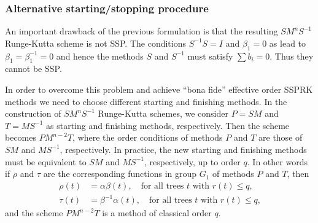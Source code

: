 \subsubsection{Alternative starting/stopping procedure}\label{subsection3.2.2}

An important drawback of the previous formulation is that the resulting \( SM^{n}S^{-1} \) Runge-Kutta scheme is not SSP. The conditions \( S^{-1}S = I \) and \( \beta_{1} = 0 \) as lead to \( \beta_{1} = \beta^{-1}_{1} = 0 \) and hence the methods \( S \) and \( S^{-1} \) must satisfy $\sum b_i = 0$.  Thus they cannot be SSP.  


In order to overcome this problem and achieve ``bona fide'' effective order SSPRK methods we need to choose different starting and finishing methods. In the construction of \( SM^{n}S^{-1} \) Runge-Kutta schemes, we consider \( P = SM \) and \( T = MS^{-1} \) as starting and finishing methods, respectively. Then the scheme becomes \( PM^{n-2}T \), where the order conditions of methods \( P \) and \( T \) are those of \( SM \) and \( MS^{-1} \), respectively.
In practice, the new starting and finishing methods must be equivalent to \( SM \) and \( MS^{-1} \), respectively, up to order $q$.
 In other words if \( \rho \) and \( \tau \) are the corresponding functions in group $G_1$ of methods \( P \) and \( T \), then
\begin{subequations} \label{eq:PT_OCs}
\begin{align}
    \rho(t) &= \alpha\beta(t), \quad \text{for all trees $t$ with $r(t) \leq q$,} \\
    \tau(t) &= \beta^{-1}\alpha(t), \quad \text{for all trees $t$ with $r(t) \leq q$,}
\end{align}
\end{subequations}
and the scheme \( PM^{n-2}T \) is a method of classical order \( q \).


